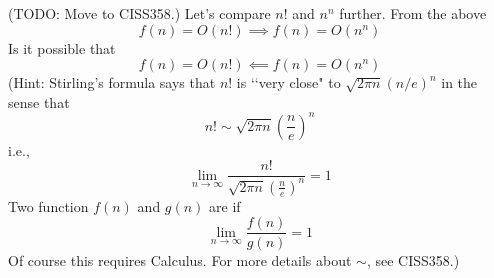 (TODO: Move to CISS358.)
Let's compare $n!$ and $n^n$ further.
From the above
\[
f(n) = O(n!) \implies f(n) = O(n^n) 
\]
Is it possible that
\[
f(n) = O(n!) \impliedby f(n) = O(n^n)
\]
(Hint:
Stirling's formula says that $n!$ is \lq\lq very close" to
$\sqrt{2\pi n} (n/e)^n$ in the sense that
\[
n! \sim \sqrt{2\pi n} \left( \frac{n}{e} \right)^n
\]
i.e.,
\[
\lim_{n \rightarrow \infty}
\frac{n!}{ \sqrt{2\pi n} \left( \frac{n}{e} \right)^n} = 1
\]
Two function $f(n)$ and $g(n)$ are  if
\[
\lim_{n \rightarrow \infty} \frac{f(n)}{g(n)} = 1
\]
Of course this requires Calculus.
For more details about $\sim$, see CISS358.)
